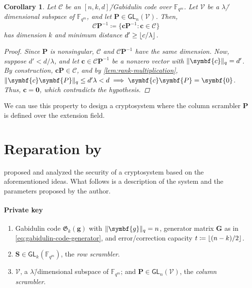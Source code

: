 \documentclass[version=last, paper=A4, parskip=half, oneside,%
toc=bibliography, toc=listof, listof=leveldown]{scrbook}
\theoremstyle{plain}
\newtheorem{corollary}{Corollary}
\theoremstyle{definition}
\theoremstyle{remark}
\renewcommand*{\vec}{\symbf}
\newcommand*{\mat}{\symbf}
\newcommand*{\GL}{\ensuremath{\mathsf{GL}}}
\newcommand*{\FF}{\ensuremath{\mathbb{F}}}
\newcommand*{\Gab}{\ensuremath{\mathfrak{G}}}
\DeclarePairedDelimiter{\floor}{\lfloor}{\rfloor}
\DeclarePairedDelimiter{\norm}{\lVert}{\rVert}
\newcommand*{\normR}[2]{\ensuremath{\norm{#1}_{#2}}}
\begin{document}
\begin{corollary}
  Let \(\mathcal{C}\) be an \([n, k, d]\)\=/Gabidulin code over \(\FF_{q^m}\).
  Let \(\mathcal{V}\) be a \(\lambda\)\=/dimensional subspace of \(\FF_{q^m}\),
  and let \(\mat{P} \in \GL_n(\mathcal{V})\).  Then,
  \[
    \mathcal{C} \mat{P}^{-1} \coloneqq \{\vec{c} \mat{P}^{-1} : \vec{c} \in \mathcal{C}\}
  \]
  has dimension \(k\) and minimum distance \(d' \ge \floor{c / {\lambda}}\).
  \begin{proof}
    Since \(\mat{P}\) is nonsingular, \(\mathcal{C}\) and
    \(\mathcal{C} \mat{P}^{-1}\) have the same dimension.  Now, suppose
    \(d' < d / {\lambda}\), and let \(\vec{c} \in \mathcal{C} \mat{P}^{-1}\) be
    a nonzero vector with \(\normR{\vec{c}}{q} = d'\).  By construction,
    \(\vec{c} \vec{P} \in \mathcal{C}\), and by \cref{lem:rank-multiplication},
    \(\normR{\vec{c} \mat{P}}{q} \le d' \lambda < d \implies \vec{c} \mat{P} = \vec{0}\).
    Thus, \(\vec{c} = \vec{0}\), which contradicts the hypothesis.
  \end{proof}
\end{corollary}

We can use this property to design a cryptosystem where the column scrambler
\(\mat{P}\) is defined over the extension field.

\section{Reparation by \texorpdfstring{\textcite{Loi17}}{Loidreau}}

\Textcite{Loi17} proposed and analyzed the security of a cryptosystem based on
the aforementioned ideas.  What follows is a description of the system and the
parameters proposed by the author.

\paragraph{Private key}
\begin{enumerate}
\item Gabidulin code \(\Gab_k(\vec{g})\) with \(\normR{\vec{g}}{q} = n\),
  generator matrix \(\mat{G}\) as in \cref{eq:gabidulin-code-generator}, and
  error\-/correction capacity \(t \coloneqq \floor{(n - k) / {2}}\).
\item \(\mat{S} \in \GL_k(\FF_{q^m})\), the \emph{row scrambler}.
\item \(\mathcal{V}\), a \(\lambda\)\=/dimensional subspace of \(\FF_{q^m}\);
  and \(\mat{P} \in \GL_n(\mathcal{V})\), the \emph{column scrambler}.
\end{enumerate}
\end{document}

